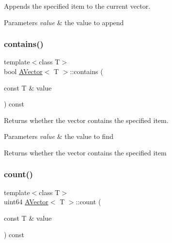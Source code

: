 Appends the specified item to the current vector. 


\begin{DoxyParams}{Parameters}
{\em value} & the value to append \\
\hline
\end{DoxyParams}
\mbox{\label{class_a_vector_ab49821902c6048beab9de0e355baa386}} 
\subsubsection{\texorpdfstring{contains()}{contains()}}
{\footnotesize\ttfamily template$<$class T$>$ \\
bool \mbox{\hyperlink{class_a_vector}{A\+Vector}}$<$ T $>$\+::contains (\begin{DoxyParamCaption}\item[{const T \&}]{value }\end{DoxyParamCaption}) const\hspace{0.3cm}{\ttfamily [inline]}}



Returns whether the vector contains the specified item. 


\begin{DoxyParams}{Parameters}
{\em value} & the value to find \\
\hline
\end{DoxyParams}
\begin{DoxyReturn}{Returns}
whether the vector contains the specified item 
\end{DoxyReturn}
\mbox{\label{class_a_vector_aa7ffcbc3145155967e6e18cacc3a0dcc}} 
\subsubsection{\texorpdfstring{count()}{count()}}
{\footnotesize\ttfamily template$<$class T$>$ \\
uint64 \mbox{\hyperlink{class_a_vector}{A\+Vector}}$<$ T $>$\+::count (\begin{DoxyParamCaption}\item[{const T \&}]{value }\end{DoxyParamCaption}) const}




